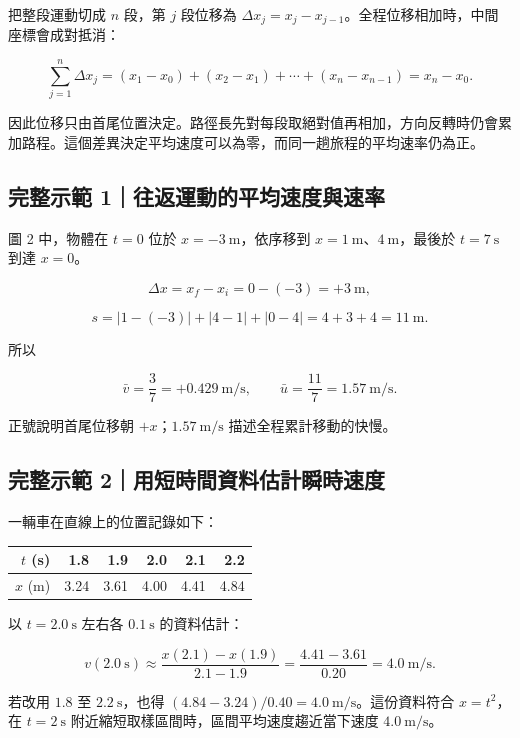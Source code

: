 \documentclass[11pt,a4paper]{article}
\newcounter{none}
\begin{document}
把整段運動切成 \(n\) 段，第 \(j\) 段位移為 \(\Delta x_j=x_j-x_{j-1}\)。全程位移相加時，中間座標會成對抵消：

\[
\sum_{j=1}^{n}\Delta x_j
=(x_1-x_0)+(x_2-x_1)+\cdots +(x_n-x_{n-1})
=x_n-x_0.
\]

因此位移只由首尾位置決定。路徑長先對每段取絕對值再相加，方向反轉時仍會累加路程。這個差異決定平均速度可以為零，而同一趟旅程的平均速率仍為正。

\begin{HandoutWorkedExample}

\subsection{完整示範 1｜往返運動的平均速度與速率}\label{ux5b8cux6574ux793aux7bc4-1ux5f80ux8fd4ux904bux52d5ux7684ux5e73ux5747ux901fux5ea6ux8207ux901fux7387}

圖 2 中，物體在 \(t=0\) 位於 \(x=-3\ \mathrm m\)，依序移到 \(x=1\ \mathrm m\)、\(4\ \mathrm m\)，最後於 \(t=7\ \mathrm s\) 到達 \(x=0\)。

\[
\Delta x=x_f-x_i=0-(-3)=+3\ \mathrm m,
\]

\[
s=|1-(-3)|+|4-1|+|0-4|=4+3+4=11\ \mathrm m.
\]

所以

\[
\bar v=\frac{3}{7}=+0.429\ \mathrm{m/s},
\qquad
\bar u=\frac{11}{7}=1.57\ \mathrm{m/s}.
\]

正號說明首尾位移朝 \(+x\)；\(1.57\ \mathrm{m/s}\) 描述全程累計移動的快慢。

\end{HandoutWorkedExample}

\begin{HandoutWorkedExample}

\subsection{完整示範 2｜用短時間資料估計瞬時速度}\label{ux5b8cux6574ux793aux7bc4-2ux7528ux77edux6642ux9593ux8cc7ux6599ux4f30ux8a08ux77acux6642ux901fux5ea6}

一輛車在直線上的位置記錄如下：

{\def\LTcaptype{none} %
\begin{longtable}[]{@{}rrrrrr@{}}
\toprule\noalign{}
\(t\) (s) & 1.8 & 1.9 & 2.0 & 2.1 & 2.2 \\
\midrule\noalign{}
\endhead
\bottomrule\noalign{}
\endlastfoot
\(x\) (m) & 3.24 & 3.61 & 4.00 & 4.41 & 4.84 \\
\end{longtable}
}

以 \(t=2.0\ \mathrm s\) 左右各 \(0.1\ \mathrm s\) 的資料估計：

\[
v(2.0\ \mathrm s)\approx
\frac{x(2.1)-x(1.9)}{2.1-1.9}
=\frac{4.41-3.61}{0.20}
=4.0\ \mathrm{m/s}.
\]

若改用 \(1.8\) 至 \(2.2\ \mathrm s\)，也得 \((4.84-3.24)/0.40=4.0\ \mathrm{m/s}\)。這份資料符合 \(x=t^2\)，在 \(t=2\ \mathrm s\) 附近縮短取樣區間時，區間平均速度趨近當下速度 \(4.0\ \mathrm{m/s}\)。

\end{HandoutWorkedExample}
\end{document}
